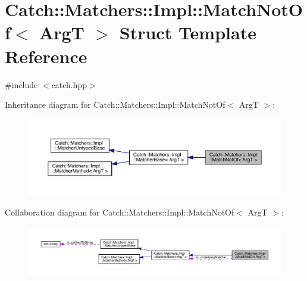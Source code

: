 \hypertarget{struct_catch_1_1_matchers_1_1_impl_1_1_match_not_of}{}\section{Catch\+:\+:Matchers\+:\+:Impl\+:\+:Match\+Not\+Of$<$ ArgT $>$ Struct Template Reference}
\label{struct_catch_1_1_matchers_1_1_impl_1_1_match_not_of}


{\ttfamily \#include $<$catch.\+hpp$>$}



Inheritance diagram for Catch\+:\+:Matchers\+:\+:Impl\+:\+:Match\+Not\+Of$<$ ArgT $>$\+:
\nopagebreak
\begin{figure}[H]
\begin{center}
\leavevmode
\includegraphics[width=350pt]{struct_catch_1_1_matchers_1_1_impl_1_1_match_not_of__inherit__graph}
\end{center}
\end{figure}


Collaboration diagram for Catch\+:\+:Matchers\+:\+:Impl\+:\+:Match\+Not\+Of$<$ ArgT $>$\+:
\nopagebreak
\begin{figure}[H]
\begin{center}
\leavevmode
\includegraphics[width=350pt]{struct_catch_1_1_matchers_1_1_impl_1_1_match_not_of__coll__graph}
\end{center}
\end{figure}
